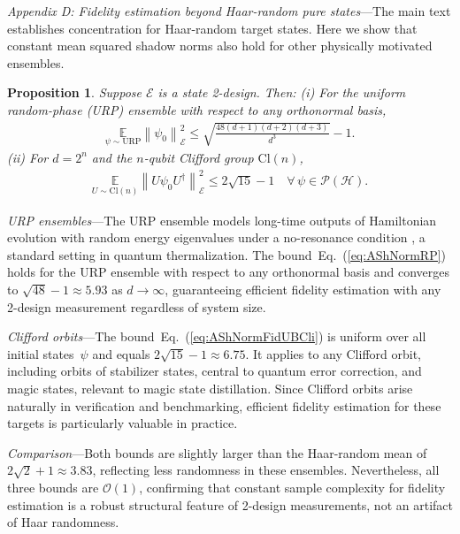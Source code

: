 \documentclass[aps,pra,twocolumn,nofootinbib,superscriptaddress,10pt]{revtex4-2}
\newtheorem{proposition}{Proposition}
\newcommand{\Cl}{\mathrm{Cl}}
\newcommand{\urp}{\mathrm{URP}}
\newcommand{\bbE}{\mathbb{E}}
\newcommand{\caE}{\mathcal{E}}
\newcommand{\caH}{\mathcal{H}}
\newcommand{\caO}{\mathcal{O}}
\newcommand{\caP}{\mathcal{P}}
\newcommand{\eref}[1]{Eq.~\textup{(\ref{#1})}}
\begin{document}
\emph{Appendix D: Fidelity estimation beyond Haar-random pure states}---The main text establishes concentration for Haar-random target states. Here we show that constant mean squared shadow norms also hold for other physically motivated ensembles.
\begin{proposition}\label{pro:AShNormFidUB}
Suppose $\caE$ is a state 2-design. Then:
\emph{(i)} For the uniform random-phase (URP) ensemble with respect to any orthonormal basis,
\begin{align}
\underset{\psi\sim\urp}{\bbE}\left\|\psi_0\right\|_\caE^2 \le\sqrt{\frac{48(d+1)(d+2)(d+3)}{d^3}}-1. \label{eq:AShNormRP}
\end{align}
\emph{(ii)} For $d=2^n$ and the $n$-qubit Clifford group $\Cl(n)$,
\begin{align}
\underset{U\sim\Cl(n)}{\bbE} \left\|U\psi_0 U^\dagger\right\|_\caE^2 \le 2\sqrt{15}-1 \quad \forall\,\psi\in\caP(\caH). \label{eq:AShNormFidUBCli}
\end{align}
\end{proposition}
\emph{URP ensembles}---The URP ensemble models long-time outputs of Hamiltonian evolution with random energy eigenvalues under a no-resonance condition \cite{Mark24}, a standard setting in quantum thermalization. The bound~\eref{eq:AShNormRP} holds for the URP ensemble with respect to any orthonormal basis and converges to $\sqrt{48}-1\approx 5.93$ as $d\to\infty$, guaranteeing efficient fidelity estimation with any 2-design measurement regardless of system size.


\emph{Clifford orbits}---The bound~\eref{eq:AShNormFidUBCli} is uniform over all initial states~$\psi$ and equals $2\sqrt{15}-1\approx 6.75$. It applies to any Clifford orbit, including orbits of stabilizer states, central to quantum error correction, and magic states, relevant to magic state distillation. Since Clifford orbits arise naturally in verification and benchmarking, efficient fidelity estimation for these targets is particularly valuable in practice.


\emph{Comparison}---Both bounds are slightly larger than the Haar-random mean of $2\sqrt{2}+1\approx 3.83$, reflecting less randomness in these ensembles. Nevertheless, all three bounds are $\caO(1)$, confirming that constant sample complexity for fidelity estimation is a robust structural feature of 2-design measurements, not an artifact of Haar randomness.



\clearpage
\newpage


\setcounter{equation}{0}
\setcounter{figure}{0}
\setcounter{table}{0}
\setcounter{theorem}{0}
\setcounter{proposition}{0}
\setcounter{lemma}{0}
\setcounter{section}{0}
\setcounter{page}{1}
\end{document}
